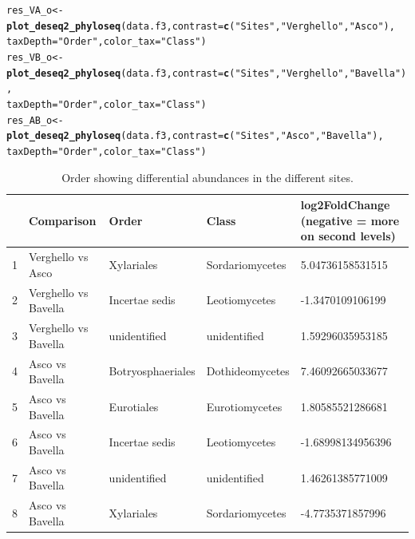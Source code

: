 \documentclass[12pt]{article}\usepackage[]{graphicx}\usepackage[]{color}
\makeatletter
\newcommand{\hlstr}[1]{\textcolor[rgb]{0.192,0.494,0.8}{#1}}%
\newcommand{\hlstd}[1]{\textcolor[rgb]{0.345,0.345,0.345}{#1}}%
\newcommand{\hlkwb}[1]{\textcolor[rgb]{0.69,0.353,0.396}{#1}}%
\newcommand{\hlkwc}[1]{\textcolor[rgb]{0.333,0.667,0.333}{#1}}%
\newcommand{\hlkwd}[1]{\textcolor[rgb]{0.737,0.353,0.396}{\textbf{#1}}}%
\newenvironment{kframe}{%
 \def\at@end@of@kframe{}%
 \ifinner\ifhmode%
  \def\at@end@of@kframe{\end{minipage}}%
  \begin{minipage}{\columnwidth}%
 \fi\fi%
 \def\FrameCommand##1{\hskip\@totalleftmargin \hskip-\fboxsep
 \colorbox{shadecolor}{##1}\hskip-\fboxsep
     \hskip-\linewidth \hskip-\@totalleftmargin \hskip\columnwidth}%
 \MakeFramed {\advance\hsize-\width
   \@totalleftmargin\z@ \linewidth\hsize
   \@setminipage}}%
 {\par\unskip\endMakeFramed%
 \at@end@of@kframe}
\newenvironment{knitrout}{}{} %
\numberwithin{figure}{section}
\makeatother
\begin{document}
\begin{knitrout}\small
{}\color{fgcolor}\begin{kframe}
\begin{alltt}
\hlstd{res_VA_o} \hlkwb{<-} \hlkwd{plot_deseq2_phyloseq}\hlstd{(data.f3,} \hlkwc{contrast} \hlstd{=} \hlkwd{c}\hlstd{(}\hlstr{"Sites"}\hlstd{,} \hlstr{"Verghello"}\hlstd{,} \hlstr{"Asco"}\hlstd{),}
                               \hlkwc{taxDepth} \hlstd{=} \hlstr{"Order"}\hlstd{,} \hlkwc{color_tax} \hlstd{=} \hlstr{"Class"}\hlstd{)}
\hlstd{res_VB_o} \hlkwb{<-} \hlkwd{plot_deseq2_phyloseq}\hlstd{(data.f3,} \hlkwc{contrast} \hlstd{=} \hlkwd{c}\hlstd{(}\hlstr{"Sites"}\hlstd{,} \hlstr{"Verghello"}\hlstd{,} \hlstr{"Bavella"}\hlstd{),}
                               \hlkwc{taxDepth} \hlstd{=} \hlstr{"Order"}\hlstd{,} \hlkwc{color_tax} \hlstd{=} \hlstr{"Class"}\hlstd{)}
\hlstd{res_AB_o} \hlkwb{<-} \hlkwd{plot_deseq2_phyloseq}\hlstd{(data.f3,} \hlkwc{contrast} \hlstd{=} \hlkwd{c}\hlstd{(}\hlstr{"Sites"}\hlstd{,} \hlstr{"Asco"}\hlstd{,} \hlstr{"Bavella"}\hlstd{),}
                               \hlkwc{taxDepth} \hlstd{=} \hlstr{"Order"}\hlstd{,} \hlkwc{color_tax} \hlstd{=} \hlstr{"Class"}\hlstd{)}
\end{alltt}
\end{kframe}
\end{knitrout}

\begin{table}[ht]
\centering
\begingroup\tiny
\begin{tabular}{lllll}
  \hline
 & Comparison & Order & Class & log2FoldChange 
 (negative = more on second levels) \\ 
  \hline
1 & Verghello vs Asco & Xylariales & Sordariomycetes & 5.04736158531515 \\ 
  2 & Verghello vs Bavella & Incertae sedis & Leotiomycetes & -1.3470109106199 \\ 
  3 & Verghello vs Bavella & unidentified & unidentified & 1.59296035953185 \\ 
  4 & Asco vs Bavella & Botryosphaeriales & Dothideomycetes & 7.46092665033677 \\ 
  5 & Asco vs Bavella & Eurotiales & Eurotiomycetes & 1.80585521286681 \\ 
  6 & Asco vs Bavella & Incertae sedis & Leotiomycetes & -1.68998134956396 \\ 
  7 & Asco vs Bavella & unidentified & unidentified & 1.46261385771009 \\ 
  8 & Asco vs Bavella & Xylariales & Sordariomycetes & -4.7735371857996 \\ 
   \hline
\end{tabular}
\endgroup
\caption{Order showing differential abundances in the different sites.} 
\end{table}
\end{document}
